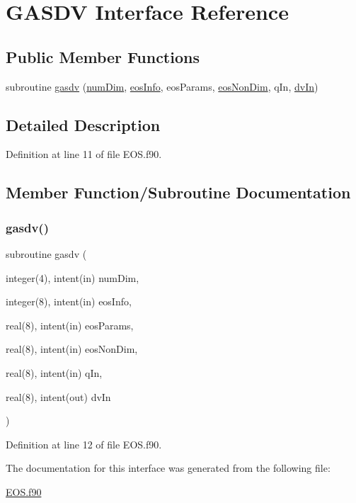 \hypertarget{interfaceeos_1_1GASDV}{}\section{G\+A\+S\+DV Interface Reference}
\label{interfaceeos_1_1GASDV}
\subsection*{Public Member Functions}
\begin{DoxyCompactItemize}
\item 
subroutine \hyperlink{interfaceeos_1_1GASDV_a72c8f57efd9f62ad6665de5d70c1df4a}{gasdv} (\hyperlink{SATKernels_8H_a680185db8546de161968dabace9e94f1}{num\+Dim}, \hyperlink{WENOKernels_8H_a9b67b225dd1b2bffc0623aa04a80bfc4}{eos\+Info}, eos\+Params, \hyperlink{WENOKernels_8H_ae84c458d3f8dce53d214eabcdc84b623}{eos\+Non\+Dim}, q\+In, \hyperlink{RoeKernels_8H_a24a50bb7f3155b1d6314eec79d33d669}{dv\+In})
\end{DoxyCompactItemize}


\subsection{Detailed Description}


Definition at line 11 of file E\+O\+S.\+f90.



\subsection{Member Function/\+Subroutine Documentation}
\hypertarget{interfaceeos_1_1GASDV_a72c8f57efd9f62ad6665de5d70c1df4a}{}\label{interfaceeos_1_1GASDV_a72c8f57efd9f62ad6665de5d70c1df4a} 
\subsubsection{\texorpdfstring{gasdv()}{gasdv()}}
{\footnotesize\ttfamily subroutine gasdv (\begin{DoxyParamCaption}\item[{integer(4), intent(in)}]{num\+Dim,  }\item[{integer(8), intent(in)}]{eos\+Info,  }\item[{real(8), intent(in)}]{eos\+Params,  }\item[{real(8), intent(in)}]{eos\+Non\+Dim,  }\item[{real(8), intent(in)}]{q\+In,  }\item[{real(8), intent(out)}]{dv\+In }\end{DoxyParamCaption})}



Definition at line 12 of file E\+O\+S.\+f90.



The documentation for this interface was generated from the following file\+:\begin{DoxyCompactItemize}
\item 
\hyperlink{EOS_8f90}{E\+O\+S.\+f90}\end{DoxyCompactItemize}
